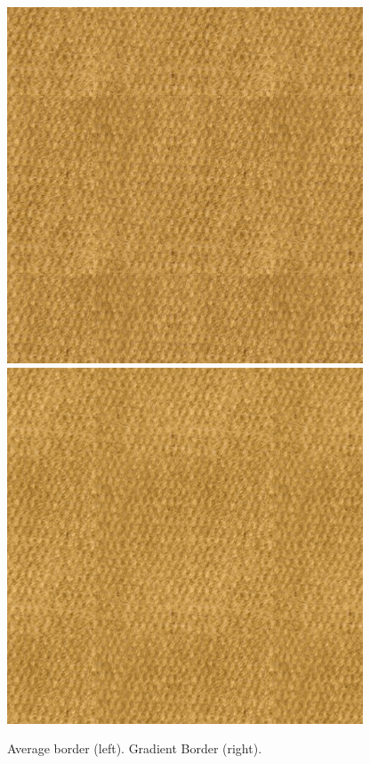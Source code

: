\begin{figure}[!h]
\centering
\includegraphics[width=0.47\linewidth]{img/ch6/comparisons/tile_average-border-inr.png}
\includegraphics[width=0.47\linewidth]{img/ch6/comparisons/tile_gradient_border.png}
\caption{Average border (left). Gradient Border (right).}
\label{f:average_border}
\end{figure}






